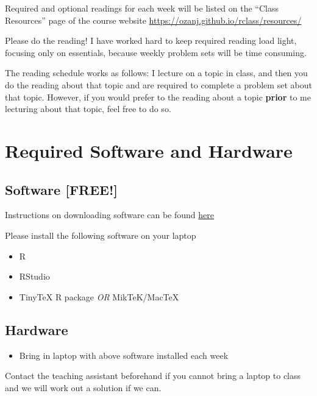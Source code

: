 \documentclass[11pt,]{article}
\providecommand{\tightlist}{%
  \setlength{\itemsep}{0pt}\setlength{\parskip}{0pt}}
\begin{document}
Required and optional readings for each week will be listed on the
``Class Resources'' page of the course website
\url{https://ozanj.github.io/rclass/resources/}

Please do the reading! I have worked hard to keep required reading load
light, focusing only on essentials, because weekly problem sets will be
time consuming.

The reading schedule works as follows: I lecture on a topic in class,
and then you do the reading about that topic and are required to
complete a problem set about that topic. However, if you would prefer to
the reading about a topic \textbf{prior} to me lecturing about that
topic, feel free to do so.

\hypertarget{required-software-and-hardware}{%
\section{Required Software and
Hardware}\label{required-software-and-hardware}}

\hypertarget{software-free}{%
\subsection{Software {[}FREE!{]}}\label{software-free}}

Instructions on downloading software can be found
\href{https://github.com/ozanj/rclass/raw/master/educ263_todo.pdf}{here}

Please install the following software on your laptop

\begin{itemize}
\tightlist
\item
  R
\item
  RStudio
\item
  TinyTeX R package \emph{OR} MikTeK/MacTeX
\end{itemize}

\hypertarget{hardware}{%
\subsection{Hardware}\label{hardware}}

\begin{itemize}
\tightlist
\item
  Bring in laptop with above software installed each week
\end{itemize}

Contact the teaching assistant beforehand if you cannot bring a laptop
to class and we will work out a solution if we can.
\end{document}

